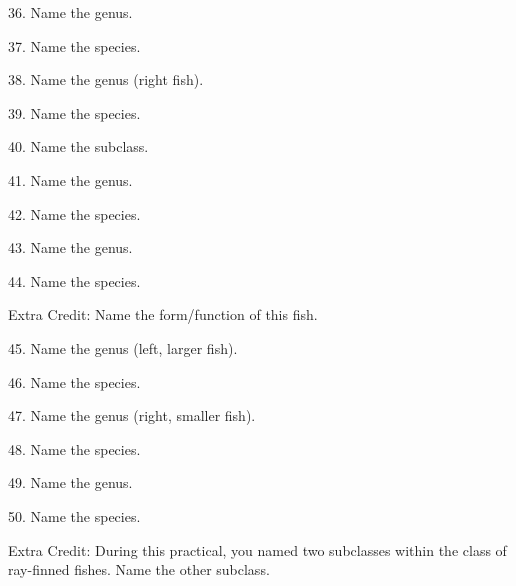 \documentclass{article}
\begin{document}
{36. Name the genus.
\vspace{0.5\baselineskip}

37. Name the species.
\vspace{0.5\baselineskip}

38. Name the genus (right fish).
\vspace{0.5\baselineskip}

39. Name the species.
\vspace{2\baselineskip}



40. Name the subclass.
\vspace{0.5\baselineskip}

41. Name the genus.
\vspace{0.5\baselineskip}

42. Name the species.
\vspace{2\baselineskip}


43. Name the genus.
\vspace{0.5\baselineskip}

44. Name the species.
\vspace{0.5\baselineskip}

Extra Credit: Name the form/function of this fish.
\vspace{2\baselineskip}


45. Name the genus (left, larger fish).
\vspace{0.5\baselineskip}

46. Name the species.
\vspace{0.5\baselineskip}

47. Name the genus (right, smaller fish).
\vspace{0.5\baselineskip}

48. Name the species.
\vspace{2\baselineskip}


49. Name the genus.
\vspace{0.5\baselineskip}

50. Name the species.
\vspace{0.5\baselineskip}

Extra Credit: During this practical, you named two subclasses within the class of ray-finned fishes. Name the other subclass. 

}%
\end{document}
